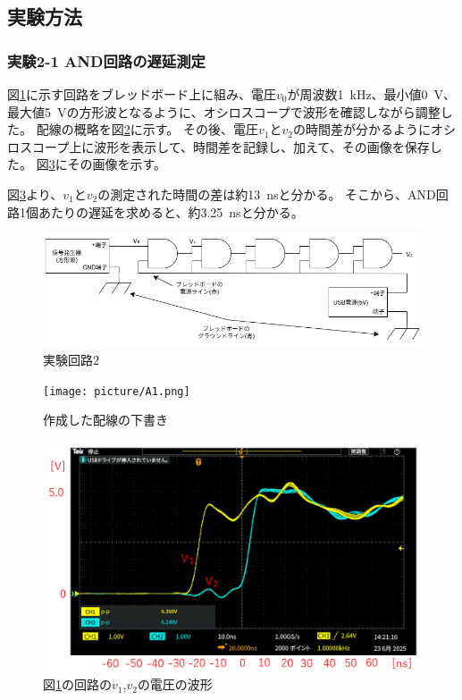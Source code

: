 \documentclass[uplatex, a4j, dvipdfmx]{jsarticle}
\begin{document}
\subsection{実験方法}
\subsubsection*{実験2-1 AND回路の遅延測定}
図\ref{E5}に示す回路をブレッドボード上に組み、電圧$v_0$が周波数\SI{1}{\kilo\hertz}、最小値\SI{0}{\volt}、最大値\SI{5}{\volt}の方形波となるように、オシロスコープで波形を確認しながら調整した。
配線の概略を図\ref{A1}に示す。
その後、電圧$v_1$と$v_2$の時間差が分かるようにオシロスコープ上に波形を表示して、時間差を記録し、加えて、その画像を保存した。
図\ref{O9}にその画像を示す。

図\ref{O9}より、$v_1$と$v_2$の測定された時間の差は約\SI{13}{\nano\second}と分かる。
そこから、AND回路1個あたりの遅延を求めると、約\SI{3.25}{\nano\second}と分かる。
\begin{figure}[htbp]
    \centering
    \includegraphics[width=0.7\linewidth]{picture/E5.png}
    \caption{実験回路2}
    \label{E5}
\end{figure}
\begin{figure}[htbp]
    \centering
    \texttt{[image: picture/A1.png]}
    \caption{作成した配線の下書き}
    \label{A1}
\end{figure}
\begin{figure}[htbp]
    \centering
    \includegraphics[width=0.8\linewidth]{picture/O9.png}
    \caption{図\ref{E5}の回路の$v_1$,$v_2$の電圧の波形}
    \label{O9}
\end{figure}
\end{document}
